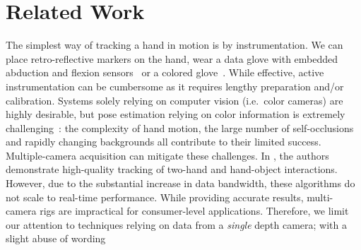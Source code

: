 



\section{Related Work}
\label{sec:related}

The simplest way of tracking a hand in motion is by instrumentation. We can place retro-reflective markers on the hand, wear a data glove with embedded abduction and flexion sensors~\cite{dipietro2008survey} or a colored glove~\cite{wang2009colorglove}. While effective, active instrumentation can be cumbersome as it requires lengthy preparation and/or calibration.
Systems solely relying on computer vision (i.e.\ color cameras) are highly desirable, but pose estimation  relying on color information is extremely challenging~\cite{erol2007survey}: the complexity of hand motion, the large number of self-occlusions and rapidly changing backgrounds all contribute to their limited success. Multiple-camera acquisition can mitigate these challenges. In \cite{ballan2013salient}, the authors demonstrate high-quality tracking of two-hand and hand-object interactions. 
However, due to the substantial increase in data bandwidth, these algorithms do not scale to real-time performance. While providing accurate results, multi-camera rigs are  impractical for consumer-level applications. Therefore, we limit our attention to techniques relying on data from a \emph{single} depth camera; with a slight abuse of wording 


